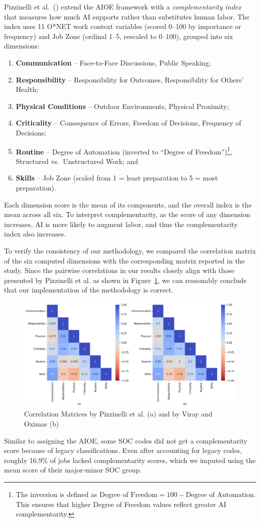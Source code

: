 Pizzinelli et al.\ (\citeyear{Pizzinelli2023Labor}) extend the AIOE framework with a \textit{complementarity index} that measures how much AI supports rather than substitutes human labor. The index uses 11 O*NET work context variables (scored 0--100 by importance or frequency) and Job Zone (ordinal 1--5, rescaled to 0--100), grouped into six dimensions:
\begin{enumerate}
    \item \textbf{Communication} -- Face-to-Face Discussions, Public Speaking;
    \item \textbf{Responsibility} -- Responsibility for Outcomes, Responsibility for Others’ Health;
    \item \textbf{Physical Conditions} -- Outdoor Environments, Physical Proximity;
    \item \textbf{Criticality} -- Consequence of Errors, Freedom of Decisions, Frequency of Decisions;
    \item \textbf{Routine} -- Degree of Automation (inverted to ``Degree of Freedom'')\footnote{The inversion is defined as $\text{Degree of Freedom} = 100 - \text{Degree of Automation}.$ This ensures that higher Degree of Freedom values reflect greater AI complementarity.}, Structured vs.\ Unstructured Work; and
    \item \textbf{Skills} -- Job Zone (scaled from 1 = least preparation to 5 = most preparation).
\end{enumerate}
Each dimension score is the mean of its components, and the overall index is the mean across all six. To interpret complementarity, as the score of any dimension increases, AI is more likely to augment labor, and thus the complementarity index also increases.

To verify the consistency of our methodology, we compared the correlation matrix of the six computed dimensions with the corresponding matrix reported in the study. 
Since the pairwise correlations in our results closely align with those presented by Pizzinelli et al. as shown in Figure~\ref{fig:correl_heatmaps}, we can reasonably conclude that our implementation of the methodology is correct.
\begin{figure}[ht] 
    \centering 
    \includegraphics[width=\linewidth]{../figures/correls.png} 
    \caption{Correlation Matrices by Pizzinelli et al. (a) and by Viray and Oximas (b)} 
    \label{fig:correl_heatmaps} 
\end{figure}

Similar to assigning the AIOE, some SOC codes did not get a complementarity score because of legacy classifications. Even after accounting for legacy codes, roughly 16.9\% of jobs lacked complementarity scores, which we imputed using the mean score of their major-minor SOC group.